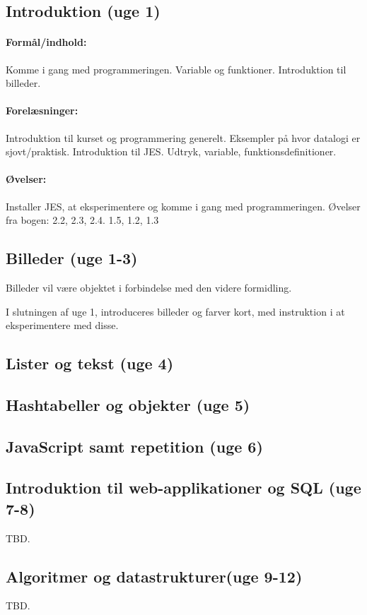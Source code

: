 \documentclass[12pt]{article}
\begin{document}
\subsection{Introduktion (uge 1)}

\paragraph{Formål/indhold:}
Komme i gang med programmeringen. Variable og funktioner. Introduktion til billeder.

\paragraph{Forelæsninger:} 
Introduktion til kurset og programmering generelt.
Eksempler på hvor datalogi er sjovt/praktisk.
Introduktion til JES. 
Udtryk, variable, funktionsdefinitioner.

\paragraph{Øvelser:}
Installer JES, at eksperimentere og komme i gang med programmeringen.
Øvelser fra bogen: 2.2, 2.3, 2.4. 1.5, 1.2, 1.3


\subsection{Billeder (uge 1-3) }

Billeder vil være objektet i forbindelse med den videre formidling.

I slutningen af uge 1, introduceres billeder og farver kort, med instruktion i at eksperimentere med disse. 

\subsection{Lister og tekst (uge 4)}


\subsection{Hashtabeller og objekter (uge 5)}
\subsection{JavaScript samt repetition (uge 6)}
\subsection{Introduktion til web-applikationer og SQL (uge 7-8)}
TBD.
\subsection{Algoritmer og datastrukturer(uge 9-12)}
TBD.
\end{document}
